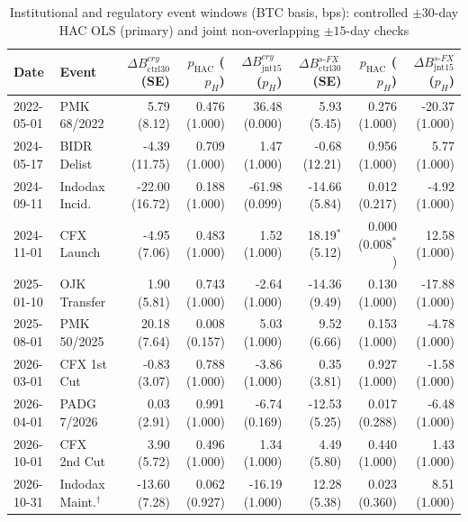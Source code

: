 \begin{table}[htbp]
\centering
\caption{Institutional and regulatory event windows (BTC basis, bps): controlled $\pm 30$-day HAC OLS (primary) and joint non-overlapping $\pm 15$-day checks}
\label{tab:events}
\fontsize{6.1}{7.3}\selectfont\setlength{\tabcolsep}{1.0pt}
\begingroup
\begin{tabular}{@{}l>{\raggedright\arraybackslash}p{1.8cm}rrrrrr@{}}
\toprule
Date & Event & $\Delta B^{cry}_{\text{ctrl30}}$ (SE) & $p_{\text{HAC}}$ ($p_H$) & $\Delta B^{cry}_{\text{jnt15}}$ ($p_H$) & $\Delta B^{s\text{-}FX}_{\text{ctrl30}}$ (SE) & $p_{\text{HAC}}$ ($p_H$) & $\Delta B^{s\text{-}FX}_{\text{jnt15}}$ ($p_H$) \\
\midrule
2022-05-01 & PMK 68/2022 & 5.79 (8.12) & 0.476 (1.000) & 36.48 (0.000) & 5.93 (5.45) & 0.276 (1.000) & -20.37 (1.000) \\
2024-05-17 & BIDR Delist & -4.39 (11.75) & 0.709 (1.000) & 1.47 (1.000) & -0.68 (12.21) & 0.956 (1.000) & 5.77 (1.000) \\
2024-09-11 & Indodax Incid. & -22.00 (16.72) & 0.188 (1.000) & -61.98 (0.099) & -14.66 (5.84) & 0.012 (0.217) & -4.92 (1.000) \\
2024-11-01 & CFX Launch & -4.95 (7.06) & 0.483 (1.000) & 1.52 (1.000) & 18.19$^*$ (5.12) & 0.000 (0.008$^*$) & 12.58 (1.000) \\
2025-01-10 & OJK Transfer & 1.90 (5.81) & 0.743 (1.000) & -2.64 (1.000) & -14.36 (9.49) & 0.130 (1.000) & -17.88 (1.000) \\
2025-08-01 & PMK 50/2025 & 20.18 (7.64) & 0.008 (0.157) & 5.03 (1.000) & 9.52 (6.66) & 0.153 (1.000) & -4.78 (1.000) \\
2026-03-01 & CFX 1st Cut & -0.83 (3.07) & 0.788 (1.000) & -3.86 (1.000) & 0.35 (3.81) & 0.927 (1.000) & -1.58 (1.000) \\
2026-04-01 & PADG 7/2026 & 0.03 (2.91) & 0.991 (1.000) & -6.74 (0.169) & -12.53 (5.25) & 0.017 (0.288) & -6.48 (1.000) \\
2026-10-01 & CFX 2nd Cut & 3.90 (5.72) & 0.496 (1.000) & 1.34 (1.000) & 4.49 (5.80) & 0.440 (1.000) & 1.43 (1.000) \\
2026-10-31 & Indodax Maint.$^\dagger$ & -13.60 (7.28) & 0.062 (0.927) & -16.19 (1.000) & 12.28 (5.38) & 0.023 (0.360) & 8.51 (1.000) \\
\bottomrule
\end{tabular}\endgroup
\begin{minipage}{\textwidth}\footnotesize\vspace{3pt}

\end{minipage}
\end{table}
